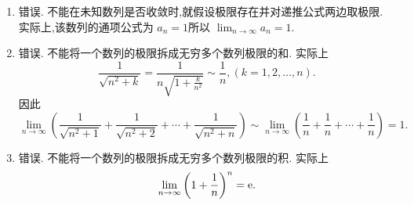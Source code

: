 \begin{solution}
    \begin{enumerate}
        \item 错误. 不能在未知数列是否收敛时,就假设极限存在并对递推公式两边取极限. 实际上,该数列的通项公式为 $a_n = 1$所以 $\lim_{n\to\infty} a_n = 1$.
        \item 错误. 不能将一个数列的极限拆成无穷多个数列极限的和. 实际上
              $$
                  \frac{1}{\sqrt{n^2+k}} = \frac{1}{n\sqrt{1+\frac{k}{n^2}}} \sim \frac{1}{n}, (k=1,2,\ldots,n).
              $$
              因此
              $$
                  \lim_{n\to\infty} \left( \frac{1}{\sqrt{n^2+1}} + \frac{1}{\sqrt{n^2+2}} + \cdots + \frac{1}{\sqrt{n^2+n}} \right) \sim \lim_{n\to\infty} \left( \frac{1}{n} + \frac{1}{n} + \cdots + \frac{1}{n} \right) = 1.
              $$
        \item 错误. 不能将一个数列的极限拆成无穷多个数列极限的积. 实际上
              $$
                  \lim_{n\to\infty} \left(1 + \frac{1}{n}\right)^n = \mathrm{e}.
              $$
    \end{enumerate}
\end{solution}

